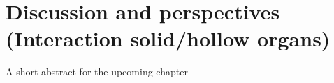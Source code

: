 \chapter{Discussion and perspectives (Interaction solid/hollow organs)}
\label{chap12}
\begin{shortAbstract}
A short abstract for the upcoming chapter
\end{shortAbstract}

